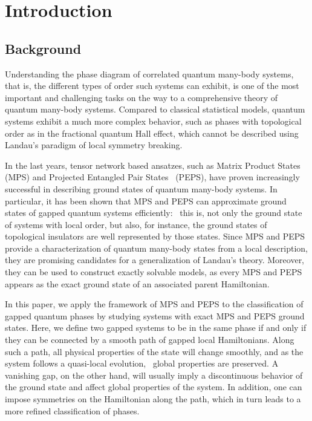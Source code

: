 \documentclass[twocolumn,superscriptaddress,prb,linenumbers]{revtex4-1}
\begin{document}
\maketitle






\section{Introduction}

\subsection{Background}

Understanding the phase diagram of correlated quantum many-body systems,
that is, the different types of order such systems can exhibit, is
one of the most important and challenging tasks on the way to a
comprehensive theory of quantum many-body systems. Compared to classical
statistical models,
quantum systems exhibit a much more complex behavior, such as phases
with topological order as in the fractional quantum Hall effect, which
cannot be described using Landau's paradigm of local symmetry breaking.

In the last years, tensor network based ansatzes, such as Matrix
Product States~\cite{fannes:FCS} (MPS) and Projected Entangled Pair
States~\cite{verstraete:2d-dmrg} (PEPS), have proven increasingly
successful in describing ground states of quantum many-body systems. In
particular, it has been shown that MPS and PEPS can approximate ground
states of gapped quantum systems
efficiently:~\cite{verstraete:faithfully,hastings:arealaw,hastings:mps-entropy-ent}
this is, not only the ground state of systems with local order, but also,
for instance, the ground states of topological insulators are well
represented by those states. Since MPS and PEPS provide a
characterization of quantum many-body states from a local description,
they are promising candidates for a generalization of Landau's
theory. Moreover, they can be used to construct
exactly solvable models, as every MPS and PEPS appears as the exact
ground state of an associated parent Hamiltonian.~\cite{fannes:FCS,%
    nachtergaele:degen-mps,perez-garcia:mps-reps,perez-garcia:parent-ham-2d}

In this paper, we apply the framework of MPS and PEPS to the
classification of gapped quantum phases by studying systems with exact MPS
and PEPS ground states. Here, we define two gapped systems to be in the
same phase if and only if they can be connected by a smooth path of gapped
local Hamiltonians. Along such a path, all physical properties of the
state will change smoothly, and as the system follows a quasi-local
evolution,~\cite{hastings:quasi-adiabatic} global properties are
preserved. A vanishing gap, on the other hand, will usually imply a
discontinuous behavior of the ground state and affect global properties of
the system.  In addition, one can impose symmetries on the Hamiltonian
along the path, which in turn leads to a more refined classification of
phases.
\end{document}
